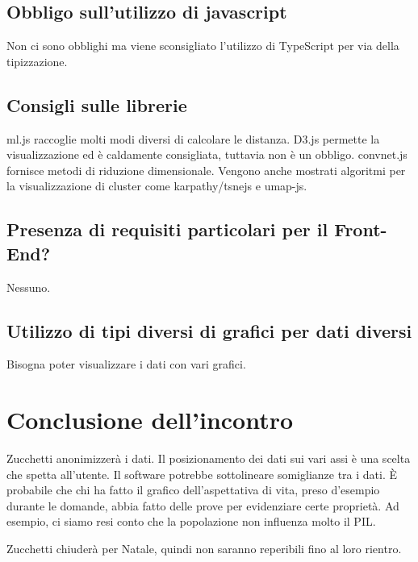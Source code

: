 \documentclass{article}
\begin{document}
    \subsection{Obbligo sull'utilizzo di javascript}
    \label{sub:domanda_16}
    Non ci sono obblighi ma viene sconsigliato l'utilizzo di TypeScript per via della tipizzazione.

    \subsection{Consigli sulle librerie}
    \label{sub:domanda_17}
    ml.js raccoglie molti modi diversi di calcolare le distanza. D3.js permette la visualizzazione ed è caldamente consigliata, tuttavia non è un obbligo. 
    convnet.js fornisce metodi di riduzione dimensionale. Vengono anche mostrati algoritmi per la visualizzazione di cluster come karpathy/tsnejs e umap-js. 

    \subsection{Presenza di requisiti particolari per il Front-End?}
    \label{sub:domanda_18}
    Nessuno.

    \subsection{Utilizzo di tipi diversi di grafici per dati diversi}
    \label{sub:domanda_19}
    Bisogna poter visualizzare i dati con vari grafici. 

\section{Conclusione dell'incontro}
\label{sec:conclusione}
Zucchetti anonimizzerà i dati. Il posizionamento dei dati sui vari assi è una scelta che spetta all'utente. Il software potrebbe sottolineare somiglianze tra i dati. È probabile che chi ha fatto il grafico dell'aspettativa di vita, preso d'esempio durante le domande, abbia fatto delle prove per evidenziare certe proprietà. Ad esempio, ci siamo resi conto che la popolazione non influenza molto il PIL.

Zucchetti chiuderà per Natale, quindi non saranno reperibili fino al loro rientro.
\end{document}
